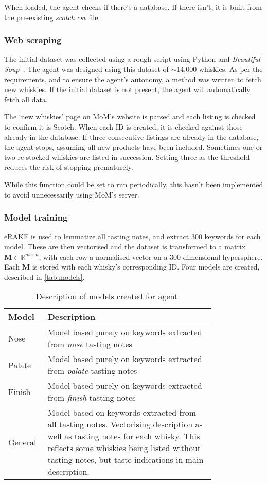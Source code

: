 When loaded, the agent checks if there's a database. If there isn't, it is built from the pre-existing \emph{scotch.csv} file.

\subsubsection{Web scraping}\label{sssec:scrape}
The initial dataset was collected using a rough script using Python and \emph{Beautiful 
Soup}~\cite{richardson2007beautiful}. The agent was designed using this dataset of $\sim$14,000
whiskies.  As per the requirements, and to ensure the agent's autonomy, a method was written to fetch new
whiskies. If the initial dataset is not present, the agent will automatically fetch all data.

The `new whiskies' page on MoM's website is parsed and each listing
is checked to confirm it is Scotch.  When each ID is created, it is checked against those already in the
database.  If three consecutive listings are already in the database, the agent stops, assuming all new products
have been included. Sometimes one or two re-stocked whiskies are listed in succession.
Setting three as the threshold reduces the risk of stopping prematurely.

While this function could be set to run periodically, this hasn't been implemented to avoid unnecessarily 
using MoM's server.

\subsubsection{Model training}
eRAKE is used to lemmatize all tasting notes, and extract 300 keywords for each model.  These are 
then vectorised and the dataset is transformed to a matrix $\textbf{M} \in \mathbb{R}^{m \times n}$, with each
row a normalised vector on a 300-dimensional hypersphere. Each $\textbf{M}$ is stored with each whisky's corresponding ID.
Four models are created, described in \autoref{tab:models}.

\begin{table}
    \centering
    \caption{Description of models created for agent.}\label{tab:models}
    \begin{tabular}{p{0.1\linewidth} p{0.7\linewidth}} 
    \toprule
    Model   & Description            \\ \midrule
    Nose    & Model based purely on keywords extracted from \emph{nose} tasting notes  \\
    Palate  & Model based purely on keywords extracted from \emph{palate} tasting notes  \\
    Finish  & Model based purely on keywords extracted from \emph{finish} tasting notes  \\
    General & Model based on keywords extracted from all tasting notes.  Vectorising description as well as tasting notes for each whisky. This reflects some whiskies being listed without tasting notes, but taste indications in main description. \\
    \bottomrule
    \end{tabular}
\end{table}

